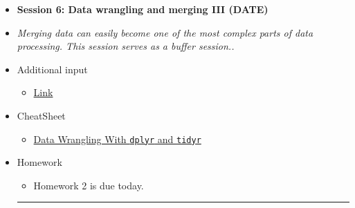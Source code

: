 \documentclass{article}
\begin{document}
\begin{itemize}
\item[] \textbf{Session 6: Data wrangling and merging III (DATE)} 
\item[]\textit{Merging data can easily become one of the most complex parts of data processing. This session serves as a buffer session..}
\item[] \faEdit \space Additional input
\begin{itemize} 
\item[$\square$] \href{url}{Link}
\end{itemize}
\item[] \faLightbulbO \space CheatSheet
\begin{itemize} 
\item[$\square$] \href{https://www.rstudio.com/wp-content/uploads/2015/02/data-wrangling-cheatsheet.pdf}{Data Wrangling With \texttt{dplyr} and \texttt{tidyr}}
\end{itemize}
\item[] \faExclamation \space Homework
\begin{itemize} 
\item[$\square$] Homework 2 is due today.
\end{itemize}

\vspace*{0.04in}
\noindent\rule{16cm}{0.7pt}
\vspace*{-0.45in}


\end{itemize}
\end{document}
